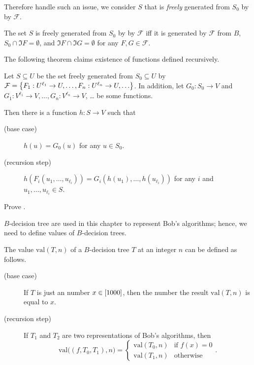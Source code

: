 Therefore handle such an issue, we consider $S$ that is \emph{freely} generated
from $S_0$ by by $\mathcal{F}$.
\begin{definition}
  The set $S$ is freely generated from $S_0$ by by $\mathcal{F}$ iff it is
  generated by $\mathcal{F}$ from $B$,
  $S_0 \cap \Im F = \emptyset$, and $\Im F \cap \Im G = \emptyset$ for any
  $F, G \in \mathcal{F}$.
\end{definition}

The following theorem claims existence of functions defined recursively.
\begin{theorem}
\label{theorem:recursion-principle}
  Let $S \subseteq U$ be the set freely generated from $S_0 \subseteq U$ by
  $\mathcal{F} =
    \set{F_1 : U^{\ell_1} \to U, \dots, F_n : U^{\ell_n} \to U, \dots}$.
  In addition, let $G_0 : S_0 \to V$ and
  $G_1 : V^{\ell_1} \to V, \dots, G_n : V^{\ell_n} \to V$, \dots
  be some functions.

  Then there is a function $h : S \to V$ such that
  \begin{description}
        \item [(base case)] $h(u) = G_0(u)$ for any $u \in S_0$.
        \item[(recursion step)] $h(F_i(u_1, \dots, u_{\ell_i})) =
            G_i(h(u_1), \dots, h(u_{\ell_i}))$ for any $i$ and
            $u_1, \dots, u_{\ell_i} \in S$.
  \end{description}
\end{theorem}

\begin{exercise}
  Prove .
\end{exercise}

$B$-decision tree are used in this chapter to represent Bob's algorithms;
hence, we need to define values of $B$-decision trees.
\begin{definition}
  The value
  $\mathrm{val}(T, n)$ of a $B$-decision tree $T$ at an integer $n$ can
  be defined as follows.
  \begin{description}
      \item [(base case)] If $T$ is just an number $x \in {[{1000}]}$,
        then the number the result $\mathrm{val}(T, n)$ is equal to $x$.
      \item[(recursion step)] If $T_1$ and $T_2$ are two representations of
        Bob's algorithms, then
        \[
          \mathrm{val}\big((f, T_0, T_1), n\big) =
          \begin{cases}
            \mathrm{val}(T_0, n) & \text{if } f(x) = 0 \\
            \mathrm{val}(T_1, n) & \text{otherwise}
          \end{cases}.
        \]
  \end{description}
\end{definition}

